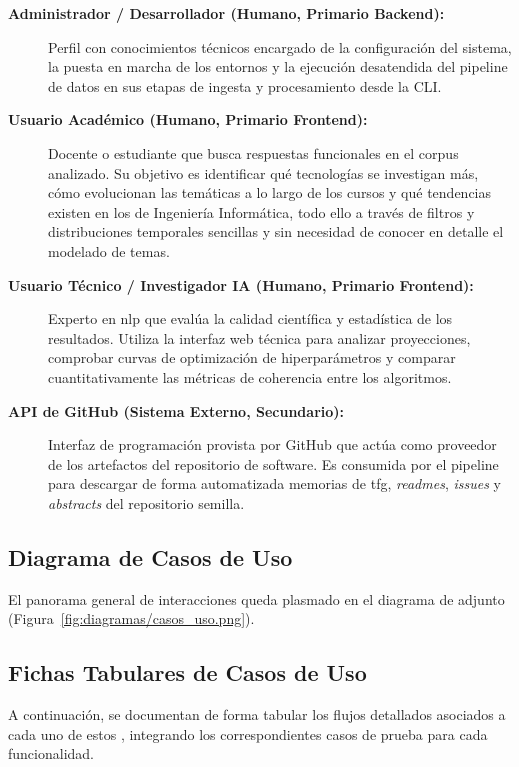 \begin{description}
	\item[\textbf{Administrador / Desarrollador (Humano, Primario Backend):}] Perfil con conocimientos técnicos encargado de la configuración del sistema, la puesta en marcha de los entornos y la ejecución desatendida del \gls{pipeline} de datos en sus etapas de ingesta y procesamiento desde la CLI.
	\item[\textbf{Usuario Académico (Humano, Primario Frontend):}] Docente o estudiante que busca respuestas funcionales en el corpus analizado. Su objetivo es identificar qué tecnologías se investigan más, cómo evolucionan las temáticas a lo largo de los cursos y qué tendencias existen en los  de Ingeniería Informática, todo ello a través de filtros y distribuciones temporales sencillas y sin necesidad de conocer en detalle el modelado de temas.
	\item[\textbf{Usuario Técnico / Investigador IA (Humano, Primario Frontend):}] Experto en \acrshort{nlp} que evalúa la calidad científica y estadística de los resultados. Utiliza la interfaz web técnica para analizar proyecciones, comprobar curvas de optimización de hiperparámetros y comparar cuantitativamente las métricas de coherencia entre los algoritmos.
	\item[\textbf{API de GitHub (Sistema Externo, Secundario):}] Interfaz de programación provista por GitHub que actúa como proveedor de los artefactos del repositorio de software. Es consumida por el \gls{pipeline} para descargar de forma automatizada memorias de \acrshort{tfg}, \textit{readmes}, \textit{issues} y \textit{abstracts} del repositorio semilla.
\end{description}

\subsection{Diagrama de Casos de Uso}
El panorama general de interacciones queda plasmado en el diagrama de
 adjunto (Figura~\ref{fig:diagramas/casos_uso.png}).


\subsection{Fichas Tabulares de Casos de Uso}
A continuación, se documentan de forma tabular los flujos detallados asociados
a cada uno de estos , integrando los correspondientes casos de
prueba para cada funcionalidad.

